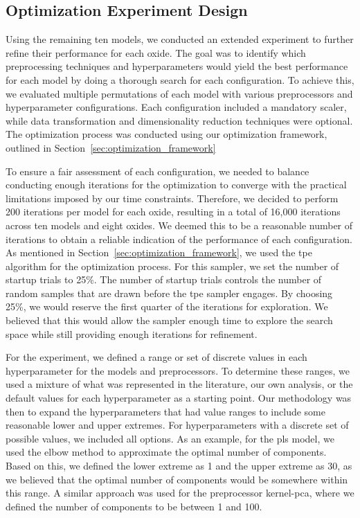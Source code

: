 \subsection{Optimization Experiment Design}\label{subsec:optimization_experiment_design}
Using the remaining ten models, we conducted an extended experiment to further refine their performance for each oxide. 
The goal was to identify which preprocessing techniques and hyperparameters would yield the best performance for each model by doing a thorough search for each configuration. 
To achieve this, we evaluated multiple permutations of each model with various preprocessors and hyperparameter configurations. 
Each configuration included a mandatory scaler, while data transformation and dimensionality reduction techniques were optional. 
The optimization process was conducted using our optimization framework, outlined in Section~\ref{sec:optimization_framework}

To ensure a fair assessment of each configuration, we needed to balance conducting enough iterations for the optimization to converge with the practical limitations imposed by our time constraints.
Therefore, we decided to perform 200 iterations per model for each oxide, resulting in a total of 16,000 iterations across ten models and eight oxides.
We deemed this to be a reasonable number of iterations to obtain a reliable indication of the performance of each configuration.
As mentioned in Section~\ref{sec:optimization_framework}, we used the \gls{tpe} algorithm for the optimization process.
For this sampler, we set the number of startup trials to 25\%.
The number of startup trials controls the number of random samples that are drawn before the \gls{tpe} sampler engages. 
By choosing 25\%, we would reserve the first quarter of the iterations for exploration.
We believed that this would allow the sampler enough time to explore the search space while still providing enough iterations for refinement. 

For the experiment, we defined a range or set of discrete values in each hyperparameter for the models and preprocessors. 
To determine these ranges, we used a mixture of what was represented in the literature, our own analysis, or the default values for each hyperparameter as a starting point. 
Our methodology was then to expand the hyperparameters that had value ranges to include some reasonable lower and upper extremes. 
For hyperparameters with a discrete set of possible values, we included all options. 
As an example, for the \gls{pls} model, we used the elbow method to approximate the optimal number of components. 
Based on this, we defined the lower extreme as 1 and the upper extreme as 30, as we believed that the optimal number of components would be somewhere within this range. 
A similar approach was used for the preprocessor \gls{kernel-pca}, where we defined the number of components to be between 1 and 100.


